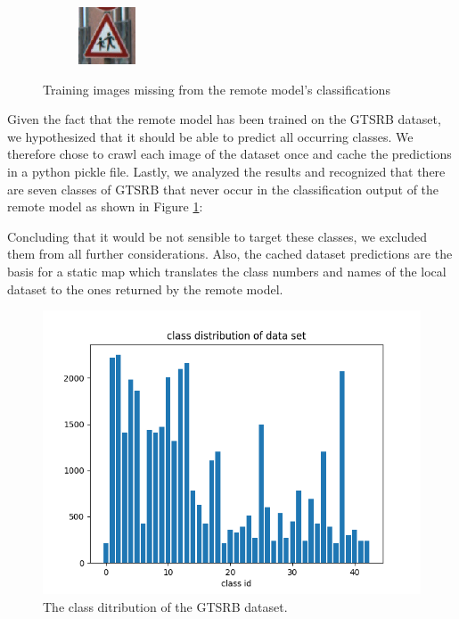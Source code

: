 \begin{figure}
\begin{subfigure}{.19\linewidth}
\end{subfigure}
\begin{subfigure}{.19\linewidth}
\includegraphics[width=0.7\linewidth]{imgs/missing/00014_00027}
\end{subfigure}
\caption{Training images missing from the remote model's classifications}
\label{fig:missing}
\end{figure}

Given the fact that the remote model has been trained on the GTSRB dataset, we hypothesized that it should be able to predict all occurring classes.
We therefore chose to crawl each image of the dataset once and cache the predictions in a python pickle file.
Lastly, we analyzed the results and recognized that there are seven classes of GTSRB that never occur in the classification output of the remote model as shown in Figure \ref{fig:missing}:

Concluding that it would be not sensible to target these classes, we excluded them from all further considerations.
Also, the cached dataset predictions are the basis for a static map which translates the class numbers and names of the local dataset to the ones returned by the remote model.

\begin{figure}
	\includegraphics[width=1.1\linewidth]{figs/class_distr}
	\caption{The class ditribution of the GTSRB dataset.}
	\label{fig:class_distr}
\end{figure}

